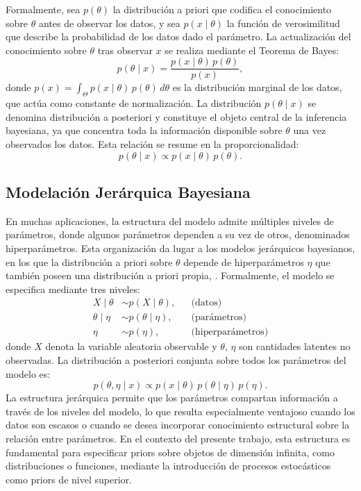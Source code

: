 Formalmente, sea $p(\theta)$ la distribución a priori que codifica el conocimiento sobre $\theta$ antes de observar los datos, y sea $p(x \mid \theta)$ la función de verosimilitud que describe la probabilidad de los datos dado el parámetro. La actualización del conocimiento sobre $\theta$ tras observar $x$ se realiza mediante el Teorema de Bayes:
\begin{equation}
    p(\theta \mid x) = \frac{p(x \mid \theta)\, p(\theta)}{p(x)},
\end{equation}
donde $p(x) = \int_\Theta p(x \mid \theta)\, p(\theta)\, d\theta$ es la distribución marginal de los datos, que actúa como constante de normalización. La distribución $p(\theta \mid x)$ se denomina distribución a posteriori y constituye el objeto central de la inferencia bayesiana, ya que concentra toda la información disponible sobre $\theta$ una vez observados los datos. Esta relación se resume en la proporcionalidad:
\begin{equation}
    p(\theta \mid x) \propto p(x \mid \theta)\, p(\theta).
\end{equation}

\subsection{Modelación Jerárquica Bayesiana}
\label{02_03_01_modelacion_jerarquica}
En muchas aplicaciones, la estructura del modelo admite múltiples  niveles de parámetros, donde algunos parámetros dependen a su vez  de otros, denominados hiperparámetros. Esta organización da lugar a  los modelos jerárquicos bayesianos, en los que la distribución a  priori sobre $\theta$ depende de hiperparámetros $\eta$ que también  poseen una distribución a priori propia, \cite{02_03_gelman2013bda}.  Formalmente, el modelo se especifica mediante tres niveles:
\begin{align}
    X \mid \theta &\sim p(X \mid \theta), && \text{(datos)} \\
    \theta \mid \eta &\sim p(\theta \mid \eta), && \text{(parámetros)} \\
    \eta &\sim p(\eta), && \text{(hiperparámetros)}
\end{align}
donde $X$ denota la variable aleatoria observable y $\theta$, $\eta$  son cantidades latentes no observadas. La distribución a posteriori  conjunta sobre todos los parámetros del modelo es:
\begin{equation}
    p(\theta, \eta \mid x) \propto p(x \mid \theta)\, p(\theta \mid \eta)\,
    p(\eta).
\end{equation}
La estructura jerárquica permite que los parámetros compartan  información a través de los niveles del modelo, lo que resulta  especialmente ventajoso cuando los datos son escasos o cuando se  desea incorporar conocimiento estructural sobre la relación entre  parámetros. En el contexto del presente trabajo, esta estructura es  fundamental para especificar priors sobre objetos de dimensión  infinita, como distribuciones o funciones, mediante la introducción  de procesos estocásticos como priors de nivel superior.

